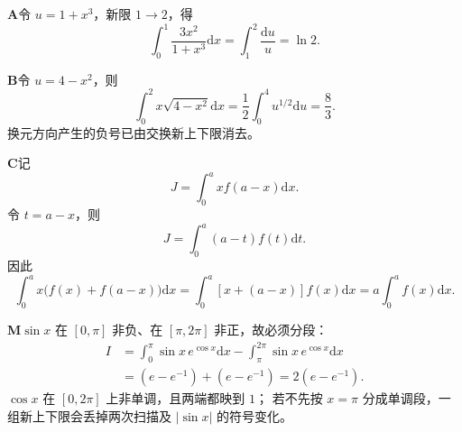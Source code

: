 \begin{solutionBox}
\textbf{A}\quad 令 \(u=1+x^3\)，新限 \(1\to2\)，得
\[
\int_0^1\frac{3x^2}{1+x^3}\mathrm dx
=\int_1^2\frac{\mathrm du}{u}=\ln2.
\]
\end{solutionBox}
\begin{solutionBox}
\textbf{B}\quad 令 \(u=4-x^2\)，则
\[
\int_0^2x\sqrt{4-x^2}\mathrm dx
=\frac12\int_0^4u^{1/2}\mathrm du
=\frac83.
\]
换元方向产生的负号已由交换新上下限消去。
\end{solutionBox}
\begin{solutionBox}
\textbf{C}\quad 记
\[
J=\int_0^axf(a-x)\mathrm dx.
\]
令 \(t=a-x\)，则
\[
J=\int_0^a(a-t)f(t)\mathrm dt.
\]
因此
\[
\int_0^ax\bigl(f(x)+f(a-x)\bigr)\mathrm dx
=\int_0^a[x+(a-x)]f(x)\mathrm dx
=a\int_0^af(x)\mathrm dx.
\]
\end{solutionBox}
\begin{solutionBox}
\textbf{M}\quad \(\sin x\) 在 \([0,\pi]\) 非负、在
\([\pi,2\pi]\) 非正，故必须分段：
\[
\begin{aligned}
I&=\int_0^\pi\sin x\,e^{\cos x}\mathrm dx
-\int_\pi^{2\pi}\sin x\,e^{\cos x}\mathrm dx\\
&=(e-e^{-1})+(e-e^{-1})
=2(e-e^{-1}).
\end{aligned}
\]
\(\cos x\) 在 \([0,2\pi]\) 上非单调，且两端都映到 \(1\)；
若不先按 \(x=\pi\) 分成单调段，一组新上下限会丢掉两次扫描及
\(|\sin x|\) 的符号变化。
\end{solutionBox}

